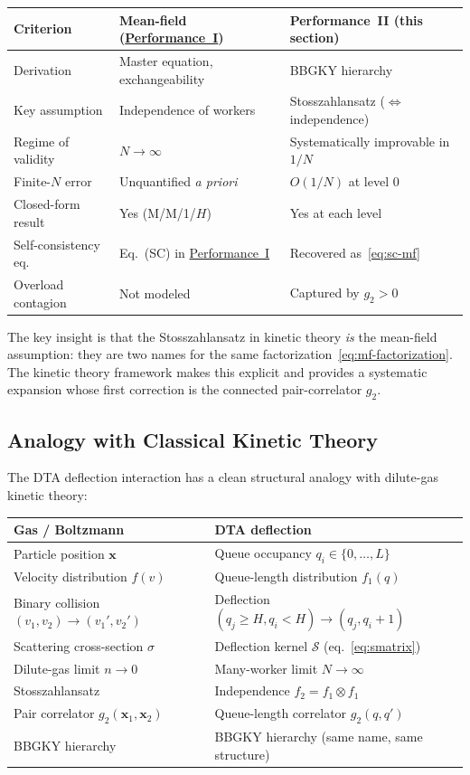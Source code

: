 \documentclass[11pt,a4paper]{report}
\newcommand{\fone}{f_1}
\newcommand{\ftwo}{f_2}
\newcommand{\gtwo}{g_2}
\newcommand{\cS}{\mathcal{S}}
\begin{document}
\begin{center}
\begin{tabular}{@{}lll@{}}
\toprule
Criterion & Mean-field (\hyperref[chap:load_balance]{Performance~I}) & Performance~II (this section) \\
\midrule
Derivation & Master equation, exchangeability & BBGKY hierarchy~\cite{gardiner2004} \\
Key assumption & Independence of workers & Stosszahlansatz ($\Leftrightarrow$ independence) \\
Regime of validity & $N \to \infty$ & Systematically improvable in $1/N$ \\
Finite-$N$ error & Unquantified \emph{a priori} & $O(1/N)$ at level 0 \\
Closed-form result & Yes (M/M/1/$H$) & Yes at each level \\
Self-consistency eq. & Eq.~(SC) in \hyperref[chap:load_balance]{Performance~I} & Recovered as~\eqref{eq:sc-mf} \\
Overload contagion & Not modeled & Captured by $\gtwo > 0$ \\
\bottomrule
\end{tabular}
\end{center}

The key insight is that the Stosszahlansatz in kinetic theory
\emph{is} the mean-field assumption: they are two names for
the same factorization~\eqref{eq:mf-factorization}.
The kinetic theory framework makes this explicit and provides a
systematic expansion whose first correction is the connected
pair-correlator $\gtwo$.

\subsection{Analogy with Classical Kinetic Theory}

The DTA deflection interaction has a clean structural analogy
with dilute-gas kinetic theory:

\medskip
\begin{center}
\begin{tabular}{@{}ll@{}}
\toprule
Gas / Boltzmann & DTA deflection \\
\midrule
Particle position $\mathbf{x}$ & Queue occupancy $q_i \in \{0,\ldots,L\}$ \\
Velocity distribution $f(v)$ & Queue-length distribution $\fone(q)$ \\
Binary collision $(v_1, v_2) \to (v_1', v_2')$ & Deflection $(q_j\geq H, q_i < H) \to (q_j, q_i+1)$ \\
Scattering cross-section $\sigma$ & Deflection kernel $\cS$ (eq.~\eqref{eq:smatrix}) \\
Dilute-gas limit $n \to 0$ & Many-worker limit $N \to \infty$ \\
Stosszahlansatz & Independence $\ftwo = \fone \otimes \fone$ \\
Pair correlator $g_2(\mathbf{x}_1, \mathbf{x}_2)$ & Queue-length correlator $\gtwo(q, q')$ \\
BBGKY hierarchy & BBGKY hierarchy (same name, same structure) \\
\bottomrule
\end{tabular}
\end{center}
\medskip
\end{document}
